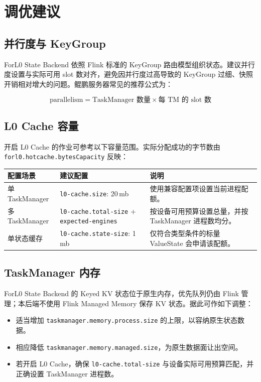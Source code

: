 \documentclass[a4paper,11pt]{article}
\newcommand{\project}{ForL0 State Backend}
\newcommand{\cfg}[1]{\nolinkurl{#1}}
\begin{document}
\section{调优建议}

\subsection{并行度与 KeyGroup}

\project{} 依照 Flink 标准的 KeyGroup 路由模型组织状态。建议并行度设置与实际可用 slot 数对齐，避免因并行度过高导致的 KeyGroup 过细、快照开销相对增大的问题。鲲鹏服务器常见的推荐公式为：

\[
\text{parallelism} = \text{TaskManager 数量} \times \text{每 TM 的 slot 数}
\]

\subsection{L0 Cache 容量}

开启 L0 Cache 的作业可参考以下容量范围。实际分配成功的字节数由 \texttt{forl0.hotcache.bytesCapacity} 反映：

\begin{table}[H]
\centering
\small
\begin{tabularx}{\textwidth}{L{3.4cm} L{4.2cm} X}
\toprule
\textbf{配置场景} & \textbf{建议配置} & \textbf{说明} \\
\midrule
单 TaskManager & \cfg{l0-cache.size}: 20\,mb & 使用兼容配置项设置当前进程配额。 \\
多 TaskManager & \cfg{l0-cache.total-size} + \cfg{expected-engines} & 按设备可用预算设置总量，并按 TaskManager 进程数均分。 \\
单状态缓存 & \cfg{l0-cache.state-size}: 1\,mb & 仅符合类型条件的标量 ValueState 会申请该配额。 \\
\bottomrule
\end{tabularx}
\end{table}

\subsection{TaskManager 内存}

\project{} 的 Keyed KV 状态位于原生内存，优先队列仍由 Flink 管理；本后端不使用 Flink Managed Memory 保存 KV 状态。据此可作如下调整：

\begin{itemize}
  \item 适当增加 \texttt{taskmanager.memory.process.size} 的上限，以容纳原生状态数据。
  \item 相应降低 \texttt{taskmanager.memory.managed.size}，为原生数据面让出空间。
  \item 若开启 L0 Cache，确保 \texttt{l0-cache.total-size} 与设备实际可用预算匹配，并正确设置 TaskManager 进程数。
\end{itemize}
\end{document}
